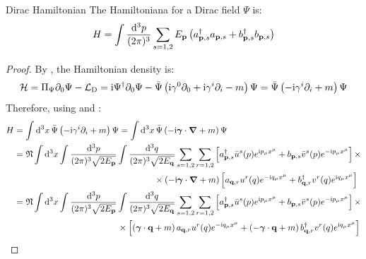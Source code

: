 \begin{proposition}{Dirac Hamiltonian}{}
  The Hamiltoniana for a Dirac field $ \Psi $ is:
  \begin{equation}
    H = \int \frac{\mathrm{d}^3p}{(2\pi)^3} \sum_{s = 1,2} E_{\mathbf{p}} \left( a_{\mathbf{p},s}^\dagger a_{\mathbf{p},s} + b_{\mathbf{p},s}^\dagger b_{\mathbf{p},s} \right)
  \end{equation}
\end{proposition}

\begin{proofbox}
  \begin{proof}
    By , the Hamiltonian density is:
    \begin{equation*}
      \mathcal{H} = \Pi_\Psi \partial_0 \Psi - \mathcal{L}_\text{D} = \mathrm{i} \Psi^\dagger \partial_0 \Psi - \bar{\Psi} \left( \mathrm{i} \gamma^0 \partial_0 + \mathrm{i} \gamma^i \partial_i - m \right) \Psi = \bar{\Psi} \left( -\mathrm{i} \gamma^i \partial_i + m \right) \Psi
    \end{equation*}
    Therefore, using  and :
    \begin{equation*}
      \begin{split}
        H
        &= \int \dd^3x\, \bar{\Psi} \left( -\img \gamma^i \pa_i + m \right) \Psi = \int \dd^3x\, \bar{\Psi} \left( -\img \bs{\gamma} \cdot \bs{\nabla} + m \right) \Psi \\
        &= \normord \int \dd^3x \int \frac{\dd^3p}{(2\pi)^3 \sqrt{2E_\ve{p}}} \int \frac{\dd^3q}{(2\pi)^3 \sqrt{2E_\ve{q}}} \sum_{s = 1,2} \sum_{r = 1,2} \left[ a_{\ve{p},s}^\dagger \bar{u}^s(p) e^{\img p_\mu x^\mu} + b_{\ve{p},s} \bar{v}^s(p) e^{-\img p_\mu x^\mu} \right] \times \\
        & \qquad \qquad \qquad \qquad \qquad \qquad \qquad \qquad \times \left( -\img \bs{\gamma} \cdot \bs{\nabla} + m \right) \left[ a_{\ve{q},r} u^r(q) e^{-\img q_\mu x^\mu} + b_{\ve{q},r}^\dagger v^r(q) e^{\img q_\mu x^\mu} \right] \\
        &= \normord \int \dd^3x \int \frac{\dd^3p}{(2\pi)^3 \sqrt{2E_\ve{p}}} \int \frac{\dd^3q}{(2\pi)^3 \sqrt{2E_\ve{q}}} \sum_{s = 1,2} \sum_{r = 1,2} \left[ a_{\ve{p},s}^\dagger \bar{u}^s(p) e^{\img p_\mu x^\mu} + b_{\ve{p},s} \bar{v}^s(p) e^{-\img p_\mu x^\mu} \right] \times \\
        & \qquad \qquad \qquad \qquad \qquad \quad \ \ \, \times \left[ \left( \bs{\gamma} \cdot \ve{q} + m \right) a_{\ve{q},r} u^r(q) e^{-\img q_\mu x^\mu} + \left( - \bs{\gamma} \cdot \ve{q} + m \right) b_{\ve{q},r}^\dagger v^r(q) e^{\img q_\mu x^\mu} \right]

\end{split}
\end{equation*}
\end{proof}
\end{proofbox}
